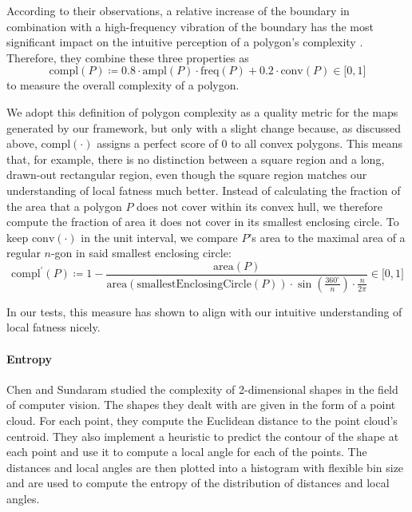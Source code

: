 According to their observations, a relative increase of the boundary in combination with a high-frequency vibration of the boundary has the most significant impact on the intuitive perception of a polygon's complexity \cite{brinkhoff1995measuring}.
Therefore, they combine these three properties as
%
\begin{equation}
\text{compl}(P) \coloneqq
0.8 \cdot \text{ampl}(P) \cdot \text{freq}(P) + 0.2 \cdot \text{conv}(P)
\in \lbrack0,1\rbrack
\end{equation}
%
to measure the overall complexity of a polygon.

We adopt this definition of polygon complexity as a quality metric for the maps generated by our framework, but only with a slight change because, as discussed above, $\text{compl}(\cdot)$ assigns a perfect score of $0$ to all convex polygons.
This means that, for example, there is no distinction between a square region and a long, drawn-out rectangular region, even though the square region matches our understanding of local fatness much better.
Instead of calculating the fraction of the area that a polygon $P$ does not cover within its convex hull, we therefore compute the fraction of area it does not cover in its smallest enclosing circle.
To keep $\text{conv}(\cdot)$ in the unit interval, we compare $P$'s area to the maximal area of a regular $n$-gon in said smallest enclosing circle:
%
\begin{equation*}
\text{compl}^\prime(P) \coloneqq
1 - \frac{\text{area}(P)}{\text{area}(\text{smallestEnclosingCircle}(P)) \cdot \sin\left(\frac{360^\circ}{n}\right) \cdot \frac{n}{2\pi}}
\in \lbrack0,1\rbrack
\end{equation*}

In our tests, this measure has shown to align with our intuitive understanding of local fatness nicely.



\paragraph{Entropy}

Chen and Sundaram \cite{chen2005estimating} studied the complexity of 2-dimensional shapes in the field of computer vision.
The shapes they dealt with are given in the form of a point cloud.
For each point, they compute the Euclidean distance to the point cloud's centroid.
They also implement a heuristic to predict the contour of the shape at each point and use it to compute a local angle for each of the points.
The distances and local angles are then plotted into a histogram with flexible bin size and are used to compute the entropy of the distribution of distances and local angles.

